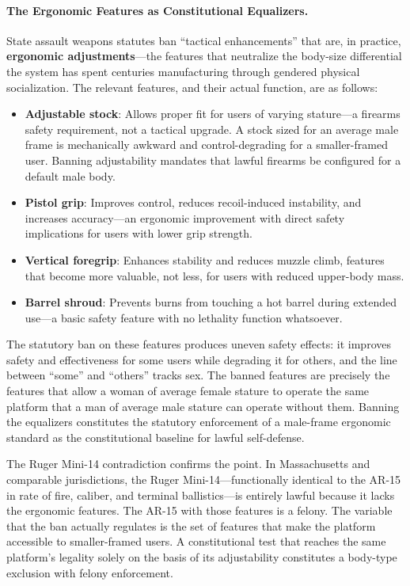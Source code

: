 \paragraph{The Ergonomic Features as Constitutional Equalizers.}

State assault weapons statutes ban ``tactical enhancements'' that are, in practice, \textbf{ergonomic adjustments}---the features that neutralize the body-size differential the system has spent centuries manufacturing through gendered physical socialization. The relevant features, and their actual function, are as follows:

\begin{itemize}
    \item \textbf{Adjustable stock}: Allows proper fit for users of varying stature---a firearms safety requirement, not a tactical upgrade. A stock sized for an average male frame is mechanically awkward and control-degrading for a smaller-framed user. Banning adjustability mandates that lawful firearms be configured for a default male body.
    \item \textbf{Pistol grip}: Improves control, reduces recoil-induced instability, and increases accuracy---an ergonomic improvement with direct safety implications for users with lower grip strength.
    \item \textbf{Vertical foregrip}: Enhances stability and reduces muzzle climb, features that become more valuable, not less, for users with reduced upper-body mass.
    \item \textbf{Barrel shroud}: Prevents burns from touching a hot barrel during extended use---a basic safety feature with no lethality function whatsoever.
\end{itemize}

The statutory ban on these features produces uneven safety effects: it improves safety and effectiveness for some users while degrading it for others, and the line between ``some'' and ``others'' tracks sex. The banned features are precisely the features that allow a woman of average female stature to operate the same platform that a man of average male stature can operate without them. Banning the equalizers constitutes the statutory enforcement of a male-frame ergonomic standard as the constitutional baseline for lawful self-defense.

The Ruger Mini-14 contradiction confirms the point. In Massachusetts and comparable jurisdictions, the Ruger Mini-14---functionally identical to the AR-15 in rate of fire, caliber, and terminal ballistics---is entirely lawful because it lacks the ergonomic features. The AR-15 with those features is a felony. The variable that the ban actually regulates is the set of features that make the platform accessible to smaller-framed users. A constitutional test that reaches the same platform's legality solely on the basis of its adjustability constitutes a body-type exclusion with felony enforcement.

